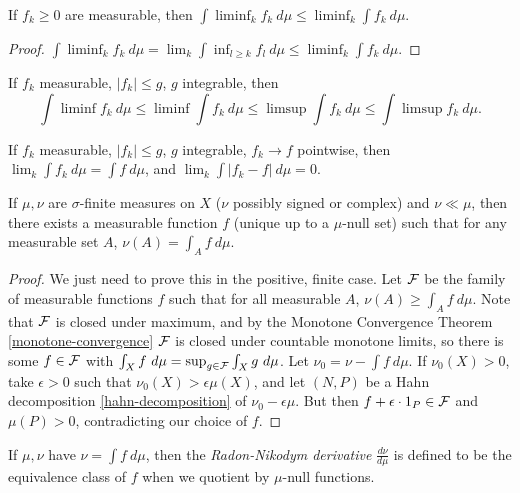 \documentclass[letterpaper,11pt]{report}
\begin{document}
\begin{lem} If $f_k \ge 0$ are measurable, then $\int \liminf_k f_k\ d\mu \le \liminf_k \int f_k\ d\mu$.
\end{lem}
\begin{proof} $\int \liminf_k f_k\ d\mu = \lim_k \int \inf_{l\ge k} f_l\ d\mu \le \liminf_k \int f_k\ d\mu$.
\end{proof}

\begin{cor} If $f_k$ measurable, $|f_k| \le g$, $g$ integrable, then
\[
\int \liminf f_k\ d\mu \le \liminf \int f_k\ d\mu \le \limsup \int f_k\ d\mu \le \int \limsup f_k\ d\mu.
\]
\end{cor}

\begin{thm}\label{dominated-convergence} If $f_k$ measurable, $|f_k| \le g$, $g$ integrable, $f_k \rightarrow f$ pointwise, then $\lim_k \int f_k\ d\mu = \int f\ d\mu$, and $\lim_k \int |f_k - f|\ d\mu = 0$.
\end{thm}

\begin{thm}\label{radon-nikodym} If $\mu, \nu$ are $\sigma$-finite measures on $X$ ($\nu$ possibly signed or complex) and $\nu \ll \mu$, then there exists a measurable function $f$ (unique up to a $\mu$-null set) such that for any measurable set $A$, $\nu(A) = \int_A f\ d\mu$.
\end{thm}
\begin{proof} We just need to prove this in the positive, finite case. Let $\mathcal{F}$ be the family of measurable functions $f$ such that for all measurable $A$, $\nu(A) \ge \int_A f\ d\mu$. Note that $\mathcal{F}$ is closed under maximum, and by the Monotone Convergence Theorem \ref{monotone-convergence} $\mathcal{F}$ is closed under countable monotone limits, so there is some $f \in \mathcal{F}$ with $\int_X f\ d\mu = \sup_{g \in \mathcal{F}} \int_X g\ d\mu$. Let $\nu_0 = \nu - \int f\ d\mu$. If $\nu_0(X) > 0$, take $\epsilon > 0$ such that $\nu_0(X) > \epsilon \mu(X)$, and let $(N,P)$ be a Hahn decomposition \ref{hahn-decomposition} of $\nu_0 - \epsilon \mu$. But then $f + \epsilon\cdot 1_P \in \mathcal{F}$ and $\mu(P) > 0$, contradicting our choice of $f$.
\end{proof}

\begin{defn} If $\mu, \nu$ have $\nu = \int f\ d\mu$, then the \emph{Radon-Nikodym derivative} $\frac{d\nu}{d\mu}$ is defined to be the equivalence class of $f$ when we quotient by $\mu$-null functions.
\end{defn}
\end{document}
